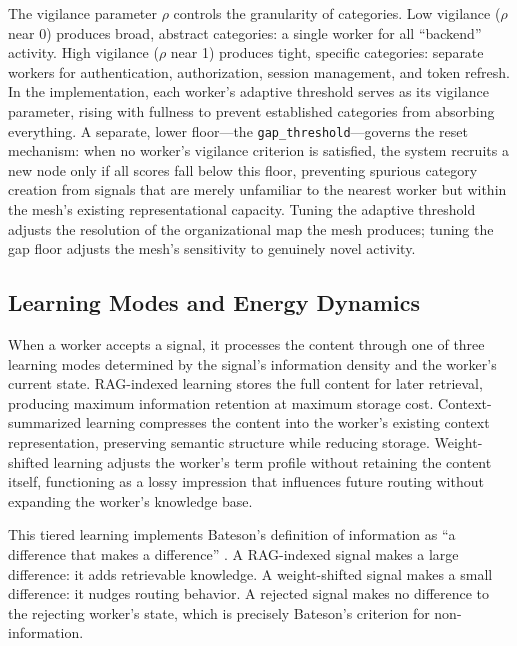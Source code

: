 \documentclass[11pt,a4paper]{article}
\begin{document}
The vigilance parameter $\rho$ controls the granularity of categories. Low vigilance ($\rho$ near 0) produces broad, abstract categories: a single worker for all ``backend'' activity. High vigilance ($\rho$ near 1) produces tight, specific categories: separate workers for authentication, authorization, session management, and token refresh. In the implementation, each worker's adaptive threshold serves as its vigilance parameter, rising with fullness to prevent established categories from absorbing everything. A separate, lower floor---the \texttt{gap\_threshold}---governs the reset mechanism: when no worker's vigilance criterion is satisfied, the system recruits a new node only if all scores fall below this floor, preventing spurious category creation from signals that are merely unfamiliar to the nearest worker but within the mesh's existing representational capacity. Tuning the adaptive threshold adjusts the resolution of the organizational map the mesh produces; tuning the gap floor adjusts the mesh's sensitivity to genuinely novel activity.


\subsection{Learning Modes and Energy Dynamics}
\label{sec:energy}

When a worker accepts a signal, it processes the content through one of three learning modes determined by the signal's information density and the worker's current state. RAG-indexed learning stores the full content for later retrieval, producing maximum information retention at maximum storage cost. Context-summarized learning compresses the content into the worker's existing context representation, preserving semantic structure while reducing storage. Weight-shifted learning adjusts the worker's term profile without retaining the content itself, functioning as a lossy impression that influences future routing without expanding the worker's knowledge base.

This tiered learning implements Bateson's definition of information as ``a difference that makes a difference'' \citep{bateson1972}. A RAG-indexed signal makes a large difference: it adds retrievable knowledge. A weight-shifted signal makes a small difference: it nudges routing behavior. A rejected signal makes no difference to the rejecting worker's state, which is precisely Bateson's criterion for non-information.
\end{document}
